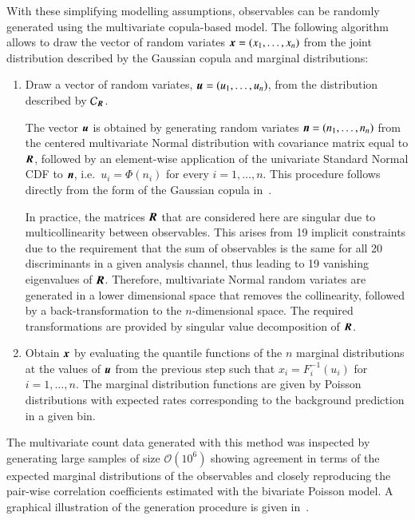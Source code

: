 With these simplifying modelling assumptions, observables can be
randomly generated using the multivariate copula-based model. The
following algorithm allows to draw the vector of random variates
$\myvec{x} = (x_1, \dots, x_n)$ from the joint distribution described
by the Gaussian copula and marginal distributions:
\begin{enumerate}
\item Draw a vector of random variates,
  $\myvec{u} = (u_1, \dots, u_n)$, from the distribution described by
  $\mathcal{C}_{\myvec{R}}$.

  The vector $\myvec{u}$ is obtained by generating random variates
  $\myvec{n} = (n_1, \dots, n_n)$ from the centered multivariate
  Normal distribution with covariance matrix equal to $\myvec{R}$,
  followed by an element-wise application of the univariate Standard
  Normal CDF to $\myvec{n}$, i.e.\ $u_i = \Phi(n_i)$ for every
  $i = 1, \dots, n$. This procedure follows directly from the form of
  the Gaussian copula in~.

  In practice, the matrices $\myvec{R}$ that are considered here are
  singular due to multicollinearity between observables. This arises
  from 19 implicit constraints due to the requirement that the sum of
  observables is the same for all 20 discriminants in a given analysis
  channel, thus leading to 19 vanishing eigenvalues of
  $\myvec{R}$. Therefore, multivariate Normal random variates are
  generated in a lower dimensional space that removes the
  collinearity, followed by a back-transformation to the
  $n$-dimensional space. The required transformations are provided by
  singular value decomposition of $\myvec{R}$.

\item Obtain $\myvec{x}$ by evaluating the quantile functions of the
  $n$ marginal distributions at the values of $\myvec{u}$ from the
  previous step such that $x_i = F_{i}^{-1}(u_i)$ for
  $i = 1, \dots, n$. The marginal distribution functions are given by
  Poisson distributions with expected rates corresponding to the
  background prediction in a given bin.
\end{enumerate}
The multivariate count data generated with this method was inspected
by generating large samples of size $\mathcal{O}(10^6)$ showing
agreement in terms of the expected marginal distributions of the
observables and closely reproducing the pair-wise correlation
coefficients estimated with the bivariate Poisson model. A graphical
illustration of the generation procedure is given
in~.


